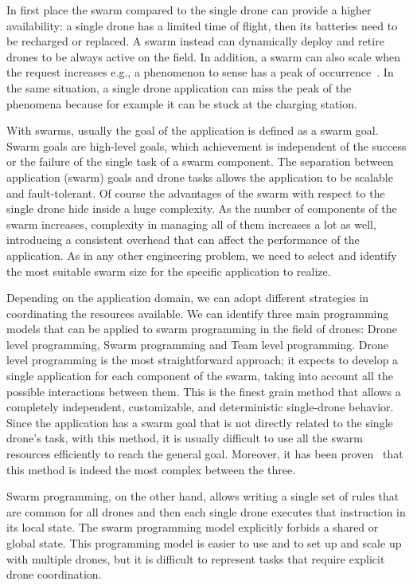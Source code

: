 In first place the swarm compared to the single drone can provide a higher availability: 
a single drone has a limited time of flight, then its batteries need to be recharged or replaced. A swarm instead can dynamically 
deploy and retire drones to be always active on the field. In addition, a swarm can also scale when the request 
increases e.g., a phenomenon to sense has a peak of occurrence~\cite{dantu2011karma}. 
In the same situation, a single drone application can miss the peak of the phenomena because for example it can be stuck at the charging station.

With swarms, usually the goal of the application is defined as a swarm goal.
Swarm goals are high-level goals, which achievement is independent of the success or the failure of the single task of a swarm component.
The separation between application (swarm) goals and drone tasks allows the application to be scalable and fault-tolerant.
Of course the advantages of the swarm with respect to the single drone hide inside a huge complexity.
As the number of components of the swarm increases, complexity in managing all of them increases a lot as well, 
introducing a consistent overhead that can affect the performance of the application.
As in any other engineering problem, we need to select and identify the most suitable swarm size for the specific application to realize.

Depending on the application domain, we can adopt different strategies in coordinating the resources available.
We can identify three main programming models that can be applied to swarm programming in the field of drones: Drone level programming, Swarm programming and Team level programming.
Drone level programming is the most straightforward approach; it expects to develop a single application for each component of the swarm, 
taking into account all the possible interactions between them. 
This is the finest grain method that allows a completely independent, customizable, and deterministic single-drone behavior. 
Since the application has a swarm goal that is not directly related to the single drone's task, 
with this method, it is usually difficult to use all the swarm resources efficiently to reach the general goal. 
Moreover, it has been proven~\cite{mottola2014team, dantu2011karma} that this method is indeed the most complex between the three.

Swarm programming\cite{quigley2009ros}, on the other hand, allows writing a single set of rules that are common for all drones 
and then each single drone executes that instruction in its local state. The swarm programming model explicitly forbids a shared or global state.
This programming model is easier to use and to set up and scale up with multiple drones, but it is difficult to represent tasks that require explicit drone coordination.

